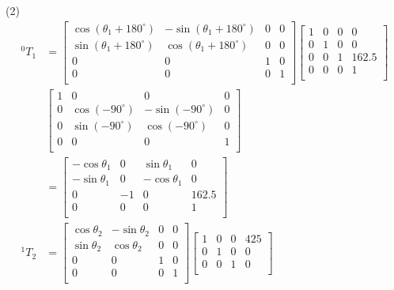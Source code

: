 \documentclass[UTF8, 12pt]{ctexart}
\begin{document}
(2)
\[
\begin{aligned}
{}^0T_1 &= \begin{bmatrix}
        \cos(\theta_1 + 180^\circ) & -\sin(\theta_1 + 180^\circ) & 0 & 0 \\
        \sin(\theta_1 + 180^\circ) & \cos(\theta_1 + 180^\circ) & 0 & 0 \\
        0 & 0 & 1 & 0 \\
        0 & 0 & 0 & 1 \\
        \end{bmatrix}
        \begin{bmatrix}
        1 & 0 & 0 & 0 \\
        0 & 1 & 0 & 0 \\
        0 & 0 & 1 & 162.5 \\
        0 & 0 & 0 & 1 \\
        \end{bmatrix} \\
        &\begin{bmatrix}
        1 & 0 & 0 & 0 \\
        0 & \cos(-90^\circ) & -\sin(-90^\circ) & 0 \\
        0 & \sin(-90^\circ) & \cos(-90^\circ) & 0 \\
        0 & 0 & 0 & 1 \\
        \end{bmatrix} \\
        &= \begin{bmatrix}
        -\cos\theta_1 & 0 & \sin\theta_1 & 0 \\
        -\sin\theta_1 & 0 & -\cos\theta_1 & 0 \\
        0 & -1 & 0 & 162.5 \\
        0 & 0 & 0 & 1 \\
        \end{bmatrix} \\[1em]
{}^1T_2 &= \begin{bmatrix}
        \cos\theta_2 & -\sin\theta_2 & 0 & 0 \\
        \sin\theta_2 & \cos\theta_2 & 0 & 0 \\
        0 & 0 & 1 & 0 \\
        0 & 0 & 0 & 1 \\
        \end{bmatrix}
        \begin{bmatrix}
        1 & 0 & 0 & 425 \\
        0 & 1 & 0 & 0 \\
        0 & 0 & 1 & 0 \\

\end{bmatrix}
\end{aligned}\]
\end{document}
